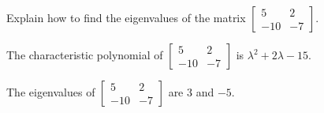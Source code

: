 
\begin{exerciseStatement}


Explain how to find the eigenvalues of the matrix \( \left[\begin{array}{cc}
5 & 2 \\
-10 & -7
\end{array}\right] \).


\end{exerciseStatement}
    
\begin{exerciseAnswer} 


The characteristic polynomial of \( \left[\begin{array}{cc}
5 & 2 \\
-10 & -7
\end{array}\right] \) is \( \lambda^{2} + 2 \lambda - 15 \).



The eigenvalues of \( \left[\begin{array}{cc}
5 & 2 \\
-10 & -7
\end{array}\right] \) are \( 3 \) and \( -5 \).


\end{exerciseAnswer}
    
